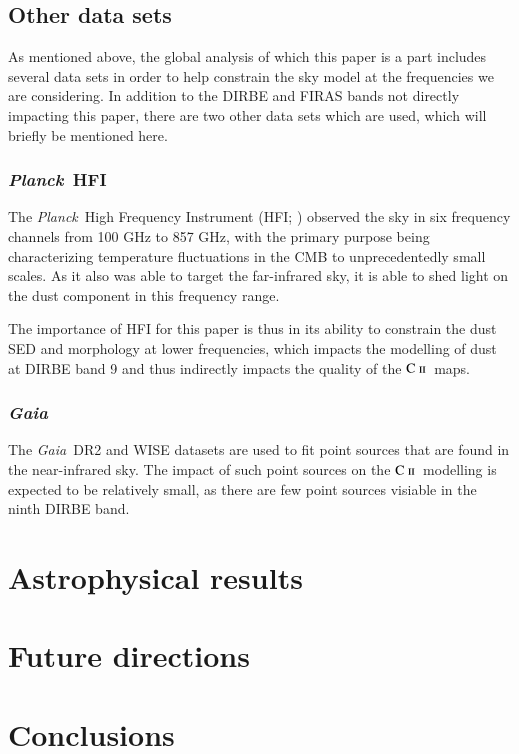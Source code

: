 \documentclass{aa}
\newcommand{\mathsc}[1]{{\normalfont\textsc{#1}}}
\def\Planck{\textit{Planck}}
\def\Gaia{\textit{Gaia}}
\def\WISE{WISE}
\newcommand{\cii}{\ensuremath{\mathsc {C\ ii}}}
\begin{document}
\subsection{Other data sets}
As mentioned above, the global analysis of which this paper is a part includes several data sets in order to help constrain the sky model at the frequencies we are considering. In addition to the DIRBE and FIRAS bands not directly impacting this paper, there are two other data sets which are used, which will briefly be mentioned here.

\subsubsection{\Planck\ HFI}
The \Planck\ High Frequency Instrument (HFI; \citealt{planck2016-l03}) observed
the sky in six frequency channels from 100 GHz to 857 GHz, with the primary
purpose being characterizing temperature fluctuations in the CMB to
unprecedentedly small scales. As it also was able to target the far-infrared
sky, it is able to shed light on the dust component in this frequency range.

The importance of HFI for this paper is thus in its ability to constrain the
dust SED and morphology at lower frequencies, which impacts the modelling of
dust at DIRBE band 9 and thus indirectly impacts the quality of the \cii\ maps.

\subsubsection{\Gaia}
The \Gaia\ DR2 \citep{gaia:2016,gaia:2018} and \WISE \citep{wright:2010}
datasets are used to fit point sources that are found in the near-infrared sky.
The impact of such point sources on the \cii\ modelling is expected to be
relatively small, as there are few point sources visiable in the ninth DIRBE
band.


\clearpage
\section{Astrophysical results}

\clearpage
\section{Future directions}

\clearpage
\section{Conclusions}
\end{document}
